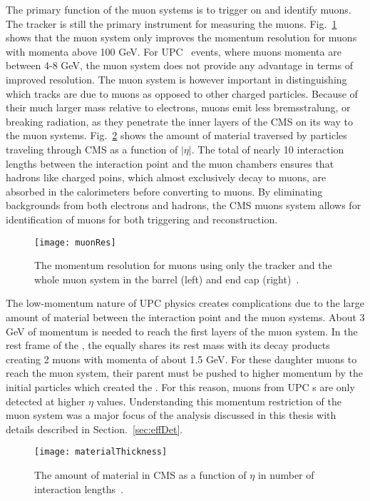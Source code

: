     The primary function of the muon systems is to trigger on and identify 
      muons.
    The tracker is still the primary instrument for measuring the muons. 
    Fig.~\ref{fig:muonRes} shows that the muon system only improves the 
      momentum resolution for muons with momenta above 100 GeV. 
    For UPC \JPsi{}~events, where muons momenta are between 4-8 GeV, the muon
      system does not provide any advantage in terms of improved resolution.
    The muon system is however important in distinguishing which tracks are 
      due to muons as opposed to other charged particles.
    Because of their much larger mass relative to electrons, muons emit less 
      bremsstralung, or breaking radiation, as they penetrate the inner layers
      of the CMS on its way to the muon systems.
    Fig.~\ref{fig:matThick} shows the amount of material traversed by particles
      traveling through CMS as a function of $|\eta|$.
    The total of nearly 10 interaction lengths between the interaction point 
      and the muon chambers ensures that hadrons like charged poins, which
      almost exclusively decay to muons, are absorbed in the calorimeters 
      before converting to muons. 
    By eliminating backgrounds from both electrons and hadrons, the CMS muons 
      system allows for identification of muons for both triggering and 
      reconstruction.
    \begin{figure}[!Hhbt]
      \centering
      \texttt{[image: muonRes]}
      \caption{ The momentum resolution for muons using only the 
        tracker and the whole muon system in the barrel (left) and end cap 
        (right)~\cite{tCmsE}.}
      \label{fig:muonRes}
    \end{figure}

    The low-momentum nature of UPC physics creates complications due to the 
      large amount of material between the interaction point and the muon 
      systems.
    About 3 GeV of momentum is needed to reach the first layers of the muon 
      system.
    In the rest frame of the \JPsi{}, the \JPsi{} equally shares its rest mass with 
      its decay products creating 2 muons with momenta of about 1.5 GeV.
    For these daughter muons to reach the muon system, their parent \JPsi{} must
      be pushed to higher momentum by the initial particles which created the
      \JPsi{}.
    For this reason, muons from UPC \JPsi{}s are only detected at higher 
      $\eta$ values.
    Understanding this momentum restriction of the muon system was a major 
      focus of the analysis discussed in this thesis with details described in 
      Section.~\ref{sec:effDet}.
    \begin{figure}[!Hhbt]
      \centering
      \texttt{[image: materialThickness]}
      \caption{The amount of material in CMS as a function of $\eta$ in 
        number of interaction lengths~\cite{tCmsE}.}
      \label{fig:matThick}
    \end{figure}

